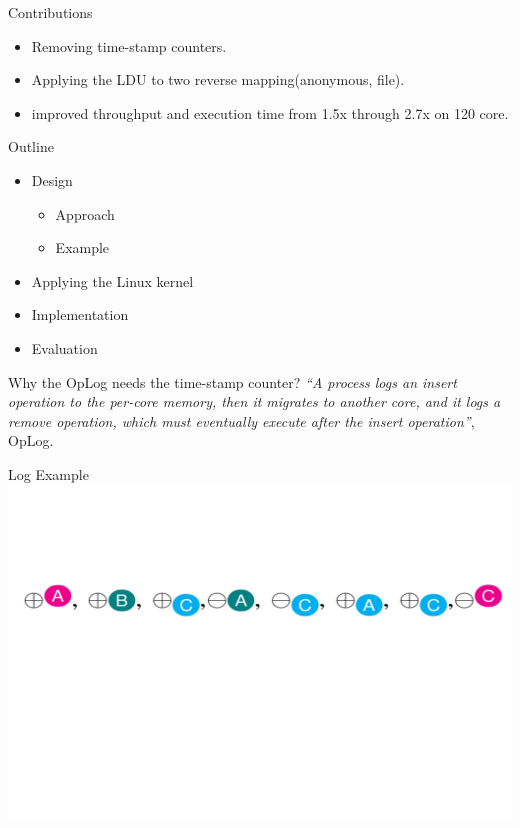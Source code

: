 \documentclass[english]{beamer} %
\begin{document}
\begin{frame}{Contributions}
    \begin{itemize}[<+-| alert@+>]
	\item Removing time-stamp counters.
	\item Applying the LDU to two reverse mapping(anonymous, file).
	\item improved throughput and execution time from 1.5x through 2.7x
	on 120 core.
	\end{itemize}
\end{frame}


\begin{frame}{Outline}
	\begin{itemize}
	\item Design
	\begin{itemize}
	\item Approach
	\item Example 
	\end{itemize}
	\item Applying the Linux kernel
	\item Implementation
	\item Evaluation
	\end{itemize}
\end{frame}



\begin{frame}{Why the OpLog needs the time-stamp counter?}
\textit{``A process logs an insert operation to the per-core memory, then
it migrates to another core, and it logs a remove operation, which must
eventually execute after the insert operation''}, OpLog.
\end{frame}



\begin{frame}{Log Example}
\includegraphics[scale=0.5]{fig/example_1}
\end{frame}
\end{document}
